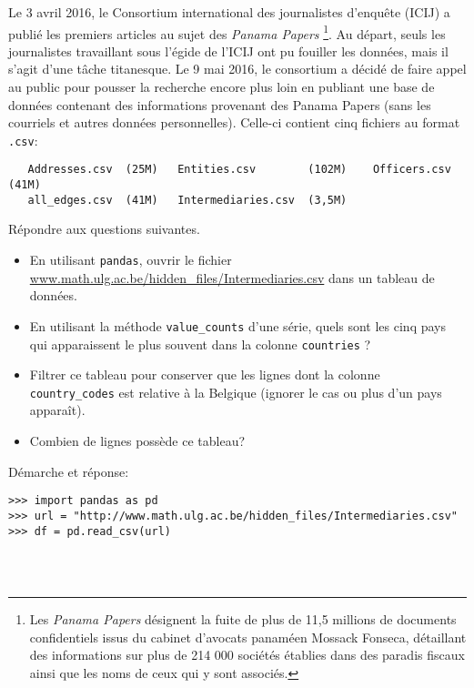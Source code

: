 \newpage
\begin{question}[2 pts]
    Le 3 avril 2016, le Consortium international des journalistes d'enquête
    (ICIJ) a publié les premiers articles au sujet des \emph{Panama Papers}
    \footnote{Les \emph{Panama Papers} désignent la fuite de plus de 11,5
	millions de documents confidentiels issus du cabinet d'avocats
	panaméen Mossack Fonseca, détaillant des informations sur plus de 214
	000 sociétés établies dans des paradis fiscaux
    ainsi que les noms de ceux qui y sont associés.}.
    Au départ, seuls les journalistes travaillant sous l'égide de
    l'ICIJ ont pu fouiller les données, mais il s’agit d’une tâche titanesque.
    Le 9 mai 2016, le consortium a décidé de faire appel au public pour
    pousser la recherche encore plus loin en publiant une base de données
    contenant des informations provenant des Panama Papers (sans les
    courriels et autres données personnelles).
Celle-ci contient cinq fichiers au format \texttt{.csv}:
\begin{verbatim}
   Addresses.csv  (25M)   Entities.csv        (102M)    Officers.csv  (41M) 
   all_edges.csv  (41M)   Intermediaries.csv  (3,5M)
\end{verbatim}
\vspace{-6pt}
    Répondre aux questions suivantes.
    \begin{itemize}
	\item En utilisant \texttt{pandas}, ouvrir le fichier
	    \url{www.math.ulg.ac.be/hidden_files/Intermediaries.csv} dans un
	    tableau de données.
	\item En utilisant la méthode \texttt{value\_counts} d'une série,
	    quels sont les cinq pays qui apparaissent le plus souvent dans
	    la colonne \texttt{countries} ?
	\item Filtrer ce tableau pour conserver que les lignes dont la
	    colonne \texttt{country\_codes} est relative à la Belgique
	    (ignorer le cas ou plus d'un pays apparaît).
	\item Combien de lignes possède ce tableau?
    \end{itemize}
\begin{mybox}
Démarche et réponse:
\begin{reponse}
\begin{verbatim}
>>> import pandas as pd
>>> url = "http://www.math.ulg.ac.be/hidden_files/Intermediaries.csv"
>>> df = pd.read_csv(url)




\end{verbatim}
\end{reponse}
\end{mybox}
\end{question}
